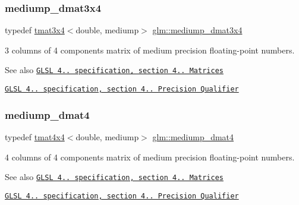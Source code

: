 \subsubsection{\texorpdfstring{mediump\+\_\+dmat3x4}{mediump\_dmat3x4}}
{\footnotesize\ttfamily typedef \hyperlink{structglm_1_1tmat3x4}{tmat3x4}$<$double, mediump$>$ \hyperlink{group__core__precision_ga38bf4080b5b7d9ecc1fdbe2932511e4b}{glm\+::mediump\+\_\+dmat3x4}}

3 columns of 4 components matrix of medium precision floating-\/point numbers.

\begin{DoxySeeAlso}{See also}
\href{http://www.opengl.org/registry/doc/GLSLangSpec.4.20.8.pdf}{\tt G\+L\+SL 4.. specification, section 4.. Matrices} 

\href{http://www.opengl.org/registry/doc/GLSLangSpec.4.20.8.pdf}{\tt G\+L\+SL 4.. specification, section 4.. Precision Qualifier} 
\end{DoxySeeAlso}
\mbox{\label{group__core__precision_ga434a0c62564f19f260ed0520995e90f3}} 
\subsubsection{\texorpdfstring{mediump\+\_\+dmat4}{mediump\_dmat4}}
{\footnotesize\ttfamily typedef \hyperlink{structglm_1_1tmat4x4}{tmat4x4}$<$double, mediump$>$ \hyperlink{group__core__precision_ga434a0c62564f19f260ed0520995e90f3}{glm\+::mediump\+\_\+dmat4}}

4 columns of 4 components matrix of medium precision floating-\/point numbers.

\begin{DoxySeeAlso}{See also}
\href{http://www.opengl.org/registry/doc/GLSLangSpec.4.20.8.pdf}{\tt G\+L\+SL 4.. specification, section 4.. Matrices} 

\href{http://www.opengl.org/registry/doc/GLSLangSpec.4.20.8.pdf}{\tt G\+L\+SL 4.. specification, section 4.. Precision Qualifier} 
\end{DoxySeeAlso}
\mbox{\label{group__core__precision_gaee918464c0be014e744ff38f37c18585}} 

